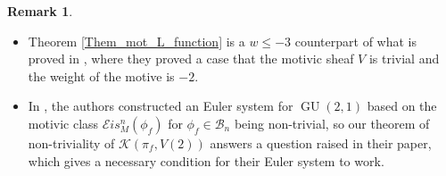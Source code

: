 \documentclass[11pt, a4paper]{amsart}
\theoremstyle{plain}
\theoremstyle{definition}
\newtheorem{remark}[theorem]{Remark}
\numberwithin{equation}{section}
\DeclareMathOperator{\GU}{GU}
\begin{document}
\begin{remark} 
    \begin{itemize}
        \item Theorem \ref{Them_mot_L_function} is a $w \le -3$ counterpart of what is proved in \cite[Theorem 8.18]{PS18}, where they proved a case that the motivic sheaf $V$ is trivial and the weight of the motive is $-2$. 
        \item In \cite{LSZ22}, the authors constructed an Euler system for $\GU(2,1)$ based on the motivic class $\mathcal{E}is_{M}^n(\phi_f)$ for $\phi_f \in \mathcal{B}_{n}$ being non-trivial, so our theorem of non-triviality of $\mathcal{K}(\pi_f, V(2))$ answers a question raised in their paper, which gives a necessary condition for their Euler system to work. 
    \end{itemize}
\end{remark}






\bigskip
\end{document}
